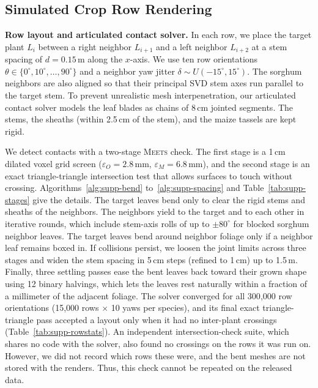 \documentclass[10pt,twocolumn,letterpaper]{article}
\newcommand{\Meets}{\textsc{Meets}}
\begin{document}
\subsection{Simulated Crop Row Rendering}
\noindent\textbf{Row layout and articulated contact solver.}
In each row, we place the target plant $L_i$ between a right neighbor $L_{i+1}$ and a left neighbor $L_{i+2}$ at a stem spacing of $d = 0.15$\,m along the $x$-axis. We use ten row orientations $\theta \in \{0^\circ, 10^\circ, \dots, 90^\circ\}$ and a neighbor yaw jitter $\delta \sim U(-15^\circ, 15^\circ)$. The sorghum neighbors are also aligned so that their principal SVD stem axes run parallel to the target stem. To prevent unrealistic mesh interpenetration, our articulated contact solver models the leaf blades as chains of 8\,cm jointed segments. The stems, the sheaths (within 2.5\,cm of the stem), and the maize tassels are kept rigid.

We detect contacts with a two-stage \Meets{} check. The first stage is a 1\,cm dilated voxel grid screen ($\varepsilon_O = 2.8$\,mm, $\varepsilon_M = 6.8$\,mm), and the second stage is an exact triangle-triangle intersection test that allows surfaces to touch without crossing. Algorithms~\ref{alg:supp-bend} to~\ref{alg:supp-spacing} and Table~\ref{tab:supp-stages} give the details. The target leaves bend only to clear the rigid stems and sheaths of the neighbors. The neighbors yield to the target and to each other in iterative rounds, which include stem-axis rolls of up to $\pm 80^\circ$ for blocked sorghum neighbor leaves. The target leaves bend around neighbor foliage only if a neighbor leaf remains boxed in. If collisions persist, we loosen the joint limits across three stages and widen the stem spacing in 5\,cm steps (refined to 1\,cm) up to 1.5\,m. Finally, three settling passes ease the bent leaves back toward their grown shape using 12 binary halvings, which lets the leaves rest naturally within a fraction of a millimeter of the adjacent foliage. The solver converged for all 300{,}000 row orientations (15{,}000 rows $\times$ 10 yaws per species), and its final exact triangle-triangle pass accepted a layout only when it had no inter-plant crossings (Table~\ref{tab:supp-rowstats}). An independent intersection-check suite, which shares no code with the solver, also found no crossings on the rows it was run on. However, we did not record which rows these were, and the bent meshes are not stored with the renders. Thus, this check cannot be repeated on the released data.
\end{document}
